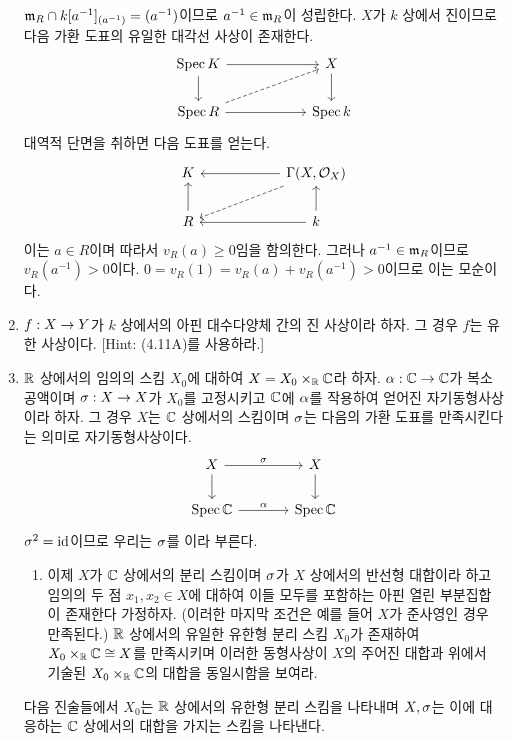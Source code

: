 \begin{enumerate}[label=\tb{4.\arabic*.},itemindent=0mm,itemsep=4mm]
	$\mathfrak{m}_R\cap k[a^{-1}]_{(a^{-1})}=(a^{-1})$이므로 $a^{-1}\in\mathfrak{m}_R$이 성립한다.
	$X$가 $k$ 상에서 진이므로 다음 가환 도표의 유일한 대각선 사상이 존재한다.
	$$\begin{tikzcd}[column sep=2cm]\Spec K\arrow[d]\arrow[r]&X\arrow[d]\\
	\Spec R\arrow[r]\arrow[dashed,ur]&\Spec k\end{tikzcd}$$
	대역적 단면을 취하면 다음 도표를 얻는다.
	$$\begin{tikzcd}[column sep=2cm]K&\Ga(X,\mc O_X)\arrow[l]\arrow[dashed,dl]\\
	R\arrow[u]&k\arrow[u]\arrow[l]\end{tikzcd}$$
	이는 $a\in R$이며 따라서 $v_R(a)\ge 0$임을 함의한다. 그러나 $a^{-1}\in\mathfrak{m}_R$이므로 $v_R(a^{-1})>0$이다.
	$0=v_R(1)=v_R(a)+v_R(a^{-1})>0$이므로 이는 모순이다.
	\item $f:X\rightarrow Y$가 $k$ 상에서의 아핀 대수다양체 간의 진 사상이라 하자. 그 경우 $f$는 유한 사상이다.
	[Hint: (4.11A)를 사용하라.]\\
	\sol
	\item {} $\mathbb R$ 상에서의 임의의 스킴 $X_0$에 대하여 $X=X_0\times_{\mathbb R}\mathbb C$라 하자.
	$\alpha:\mathbb C\rightarrow\mathbb C$가 복소 공액이며 $\sigma:X\rightarrow X$가 $X_0$를 고정시키고 $\mathbb C$에 $\alpha$를 작용하여 얻어진 자기동형사상이라 하자.
	그 경우 $X$는 $\mathbb C$ 상에서의 스킴이며 $\sigma$는 다음의 가환 도표를 만족시킨다는 의미로  자기동형사상이다.
	$$\begin{tikzcd}[column sep=large]X\arrow[r,"\si"]\arrow[d]&X\arrow[d]\\\Spec\C\arrow[r,"\al"]&\Spec\C\end{tikzcd}$$
	$\sigma^2=\mathrm{id}$이므로 우리는 $\sigma$를 이라 부른다.
	\begin{enumerate}[label=(\alph*)]
	\item 이제 $X$가 $\mathbb C$ 상에서의 분리 스킴이며 $\sigma$가 $X$ 상에서의 반선형 대합이라 하고
	임의의 두 점 $x_1,x_2\in X$에 대하여 이들 모두를 포함하는 아핀 열린 부분집합이 존재한다 가정하자.
	(이러한 마지막 조건은 예를 들어 $X$가 준사영인 경우 만족된다.)
	$\mathbb R$ 상에서의 유일한 유한형 분리 스킴 $X_0$가 존재하여 $X_0\times_{\mathbb R}\mathbb C\cong X$를 만족시키며
	이러한 동형사상이 $X$의 주어진 대합과 위에서 기술된 $X_0\times_{\mathbb R}\mathbb C$의 대합을 동일시함을 보여라.
	\end{enumerate}
	다음 진술들에서 $X_0$는 $\mathbb R$ 상에서의 유한형 분리 스킴을 나타내며
	$X,\sigma$는 이에 대응하는 $\mathbb C$ 상에서의 대합을 가지는 스킴을 나타낸다.
	\begin{enumerate}[label=(\alph*)]

\end{enumerate}
\end{enumerate}
